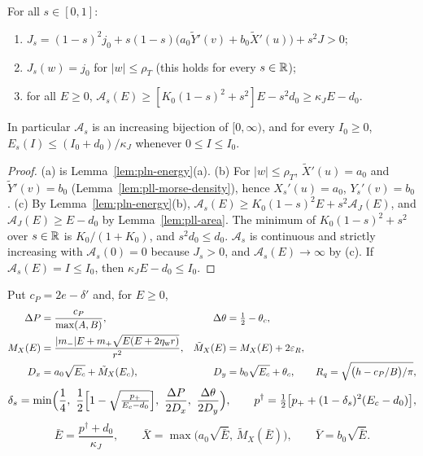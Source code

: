 \begin{lemma}\label{lem:pll-density-area}
For all $s\in[0,1]$:
\begin{enumerate}[label=(\alph*)]
\item $J_s=(1-s)^2j_0+s(1-s)\bigl(a_0\tilde Y'(v)+b_0\tilde X'(u)\bigr)+s^2J>0$;
\item $J_s(w)=j_0$ for $|w|\le\rho_T$ (this holds for every $s\in\mathbb{R}$);
\item for all $E\ge0$, $\mathcal A_s(E)\ge[K_0(1-s)^2+s^2]E-s^2d_0\ge\kappa_JE-d_0$.
\end{enumerate}
In particular $\mathcal A_s$ is an increasing bijection of $[0,\infty)$, and for every $I_0\ge0$,
$E_s(I)\le(I_0+d_0)/\kappa_J$ whenever $0\le I\le I_0$.
\end{lemma}

\begin{proof}
(a) is Lemma~\ref{lem:pln-energy}(a). (b) For $|w|\le\rho_T$, $\tilde X'(u)=a_0$ and $\tilde Y'(v)=b_0$
(Lemma~\ref{lem:pll-morse-density}), hence $X_s'(u)=a_0$, $Y_s'(v)=b_0$. (c) By Lemma~\ref{lem:pln-energy}(b),
$\mathcal A_s(E)\ge K_0(1-s)^2E+s^2\mathcal A_J(E)$, and $\mathcal A_J(E)\ge E-d_0$ by Lemma~\ref{lem:pll-area}. The
minimum of $K_0(1-s)^2+s^2$ over $s\in\mathbb{R}$ is $K_0/(1+K_0)$, and $s^2d_0\le d_0$. $\mathcal A_s$ is continuous and
strictly increasing with $\mathcal A_s(0)=0$ because $J_s>0$, and $\mathcal A_s(E)\to\infty$ by (c). If
$\mathcal A_s(E)=I\le I_0$, then $\kappa_JE-d_0\le I_0$.
\end{proof}

\begin{definition}\label{def:pll-source-constants}
Put $c_P=2e-\delta'$ and, for $E\ge0$,
\begin{align*}
 \Delta P&=\frac{c_P}{\max(A,B)}, & \Delta\theta&=\tfrac12-\theta_c,\\
 M_X(E)&=\frac{|m_-|E+m_+\sqrt{E(E+2\eta_{\rm w} r)}}{r^2}, & \tilde M_X(E)&=M_X(E)+2\varepsilon_R,\\
 D_x&=a_0\sqrt{E_c}+\tilde M_X(E_c), & D_y&=b_0\sqrt{E_c}+\theta_c,\qquad R_q=\sqrt{\bigl(h-c_P/B\bigr)/\pi},
\end{align*}
\[
 \delta_s=\min\Bigl(\frac14,\ \frac12\Bigl[1-\sqrt{\tfrac{p_+}{E_c-d_0}}\Bigr],\
 \frac{\Delta P}{2D_x},\ \frac{\Delta\theta}{2D_y}\Bigr),\qquad
 p^\dagger=\tfrac12\bigl[p_++(1-\delta_s)^2(E_c-d_0)\bigr],
\]
\[
 \bar E=\frac{p^\dagger+d_0}{\kappa_J},\qquad \bar X=\max\bigl(a_0\sqrt{\bar E},\,\tilde M_X(\bar E)\bigr),
 \qquad \bar Y=b_0\sqrt{\bar E}.
\]
\end{definition}

